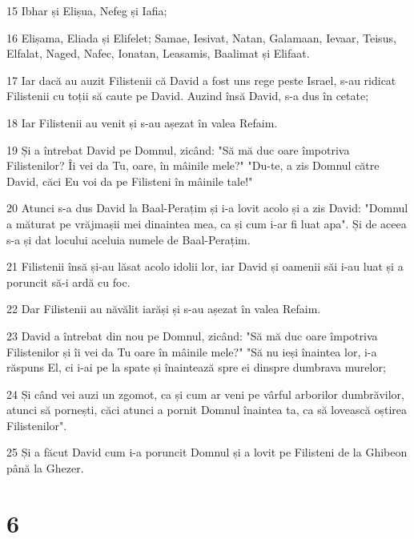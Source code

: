 \par 15 Ibhar și Elișua, Nefeg și Iafia;
\par 16 Elișama, Eliada și Elifelet; Samae, Iesivat, Natan, Galamaan, Ievaar, Teisus, Elfalat, Naged, Nafec, Ionatan, Leasamis, Baalimat și Elifaat.
\par 17 Iar dacă au auzit Filistenii că David a fost uns rege peste Israel, s-au ridicat Filistenii cu toții să caute pe David. Auzind însă David, s-a dus în cetate;
\par 18 Iar Filistenii au venit și s-au așezat în valea Refaim.
\par 19 Și a întrebat David pe Domnul, zicând: "Să mă duc oare împotriva Filistenilor? Îi vei da Tu, oare, în mâinile mele?" "Du-te, a zis Domnul către David, căci Eu voi da pe Filisteni în mâinile tale!"
\par 20 Atunci s-a dus David la Baal-Perațim și i-a lovit acolo și a zis David: "Domnul a măturat pe vrăjmașii mei dinaintea mea, ca și cum i-ar fi luat apa". Și de aceea s-a și dat locului aceluia numele de Baal-Perațim.
\par 21 Filistenii însă și-au lăsat acolo idolii lor, iar David și oamenii săi i-au luat și a poruncit să-i ardă cu foc.
\par 22 Dar Filistenii au năvălit iarăși și s-au așezat în valea Refaim.
\par 23 David a întrebat din nou pe Domnul, zicând: "Să mă duc oare împotriva Filistenilor și îi vei da Tu oare în mâinile mele?" "Să nu ieși înaintea lor, i-a răspuns El, ci i-ai pe la spate și înaintează spre ei dinspre dumbrava murelor;
\par 24 Și când vei auzi un zgomot, ca și cum ar veni pe vârful arborilor dumbrăvilor, atunci să pornești, căci atunci a pornit Domnul înaintea ta, ca să lovească oștirea Filistenilor".
\par 25 Și a făcut David cum i-a poruncit Domnul și a lovit pe Filisteni de la Ghibeon până la Ghezer.

\chapter{6}

